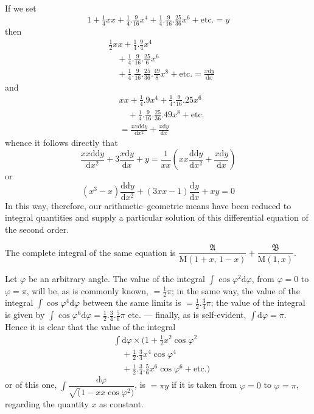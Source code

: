 \begingroup
\renewcommand{\arraystretch}{1.45}
If we set
\[
1+\tfrac14xx+\tfrac14.\tfrac9{16}x^4
+\tfrac14.\tfrac9{16}.\tfrac{25}{36}x^6+\text{etc.}=y
\]
then
\[
\begin{aligned}&\tfrac12xx+\tfrac14.\tfrac94x^4\\&\quad+\tfrac14.\tfrac9{16}.\tfrac{25}{6}x^6\\&\quad+\tfrac14.\tfrac9{16}.\tfrac{25}{36}.\tfrac{49}{8}x^8
+\text{etc.}=\frac{x\mathrm{d}y}{\mathrm{d}x}\end{aligned}
\]
and
\[
\begin{aligned}&xx+\tfrac14.9x^4+\tfrac14.\tfrac9{16}.25x^6\\&\quad+\tfrac14.\tfrac9{16}.\tfrac{25}{36}.49x^8+\text{etc.}\\&=\frac{xx\mathrm{dd}y}{\mathrm{d}x^2}+\frac{x\mathrm{d}y}{\mathrm{d}x}\end{aligned}
\]
whence it follows directly that
\[
\frac{xx\mathrm{dd}y}{\mathrm{d}x^2}+3\frac{x\mathrm{d}y}{\mathrm{d}x}+y
=\frac1{xx}\left(xx\frac{\mathrm{dd}y}{\mathrm{d}x^2}+\frac{x\mathrm{d}y}{\mathrm{d}x}\right)
\]
or
\[
(x^3-x)\frac{\mathrm{dd}y}{\mathrm{d}x^2}
+(3xx-1)\frac{\mathrm{d}y}{\mathrm{d}x}+xy=0
\]
In this way, therefore, our arithmetic–geometric means have been reduced to integral quantities
and supply a particular solution of this differential equation of the second order.

The complete integral of the same equation is
\(\dfrac{\mathfrak{A}}{\mathrm{M}(1+x,\,1-x)}+\dfrac{\mathfrak{B}}{\mathrm{M}(1,x)}\).

Let \(\varphi\) be an arbitrary angle. The value of the integral
\(\int\cos\varphi^2\mathrm{d}\varphi\), from \(\varphi=0\) to
\(\varphi=\pi\), will be, as is commonly known, \(=\tfrac12\pi\); in the same way,
the value of the integral \(\int\cos\varphi^4\mathrm{d}\varphi\) between the same limits is
\(=\tfrac12.\tfrac34\pi\); the value of the integral is given by
\(\int\cos\varphi^6\mathrm{d}\varphi=\tfrac12.\tfrac34.\tfrac56\pi\)
etc. --- finally, as is self-evident, \(\int\mathrm{d}\varphi=\pi\).
Hence it is clear that the value of the integral
\[
\begin{aligned}&\int\mathrm{d}\varphi\times
\bigl(1+\tfrac12x^2\cos\varphi^2\\&\quad+\tfrac12.\tfrac34x^4\cos\varphi^4\\&\quad+\tfrac12.\tfrac34.\tfrac56x^6\cos\varphi^6+\text{etc.}\bigr)\end{aligned}
\]
or of this one, \(\int\dfrac{\mathrm{d}\varphi}{\surd(1-xx\cos\varphi^2)}\),
is \(=\pi y\) if it is taken from \(\varphi=0\) to \(\varphi=\pi\),
regarding the quantity \(x\) as constant.

